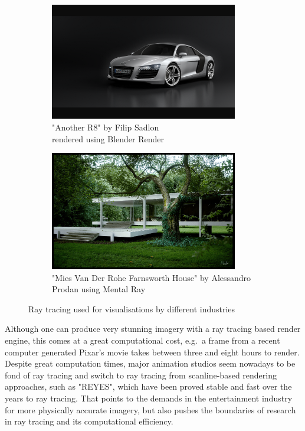 \documentclass{article}
\begin{document}
\begin{figure}[h]
	\centering
	
	\begin{subfigure}{0.5\textwidth}
		\includegraphics[width=0.9\textwidth]{audi}
		\caption{"Another R8" by Filip Sadlon \\ rendered using Blender Render}
		\label{fig:audi}
	\end{subfigure}%
	\hfill
	\begin{subfigure}{0.5\textwidth}
		\includegraphics[width=0.9\textwidth]{archi_render}
		\caption{"Mies Van Der Rohe Farnsworth House" by Alessandro Prodan using Mental Ray}
		\label{fig:arch}
	\end{subfigure}
	
	\caption{Ray tracing used for visualisations by different industries}
	\label{fig:image2}
\end{figure}

Although one can produce very stunning imagery with a ray tracing based render engine, this  comes at a great computational cost, e.g.\ a frame from a recent computer generated Pixar's movie takes between three and eight hours to render. \cite{pixarRentime} \\
Despite great computation times, major animation studios seem nowadays to be fond of ray tracing and switch to ray tracing from scanline-based rendering approaches, such as "REYES", which have been proved stable and fast over the years to ray tracing. \cite{pixarSwitch} That points to the demands in the entertainment industry for more physically accurate imagery, but also pushes the boundaries of research in ray tracing and its computational efficiency. \cite{disneyHyperion}
\end{document}
